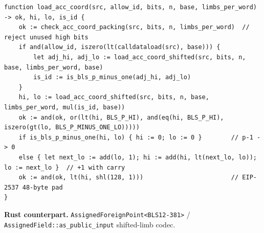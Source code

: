 \begin{lstlisting}[style=yul]
function load_acc_coord(src, allow_id, bits, n, base, limbs_per_word) -> ok, hi, lo, is_id {
    ok := check_acc_coord_packing(src, bits, n, limbs_per_word)  // reject unused high bits
    if and(allow_id, iszero(lt(calldataload(src), base))) {
        let adj_hi, adj_lo := load_acc_coord_shifted(src, bits, n, base, limbs_per_word, base)
        is_id := is_bls_p_minus_one(adj_hi, adj_lo)
    }
    hi, lo := load_acc_coord_shifted(src, bits, n, base, limbs_per_word, mul(is_id, base))
    ok := and(ok, or(lt(hi, BLS_P_HI), and(eq(hi, BLS_P_HI), iszero(gt(lo, BLS_P_MINUS_ONE_LO)))))
    if is_bls_p_minus_one(hi, lo) { hi := 0; lo := 0 }        // p-1 -> 0
    else { let next_lo := add(lo, 1); hi := add(hi, lt(next_lo, lo)); lo := next_lo }  // +1 with carry
    ok := and(ok, lt(hi, shl(128, 1)))                        // EIP-2537 48-byte pad
}
\end{lstlisting}

\textbf{Rust counterpart.} \texttt{AssignedForeignPoint<BLS12-381>} /
\texttt{AssignedField::as\_\allowbreak{}public\_\allowbreak{}input} shifted-limb codec.

